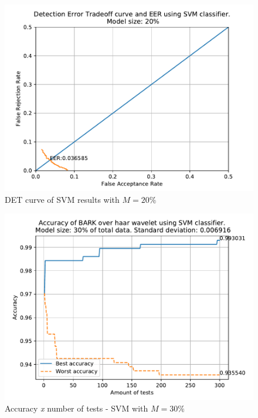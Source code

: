 	\begin{figure}[H]
		\centering
		\includegraphics[scale=.8]{images/results/det/DET_for_classifier_SVM_20.pdf}
		\caption{DET curve of SVM results with $M=20\%$}
		\label{fig:detsvm20}
	\end{figure}
	\begin{figure}[H]
		\centering
		\includegraphics[scale=.8]{images/results/confusionMatrices/classifier_SVM_30.pdf}
		\caption{Accuracy \textit{x} number of tests - SVM with $M=30\%$}
		\label{fig:classifiersvm30}
	\end{figure}
